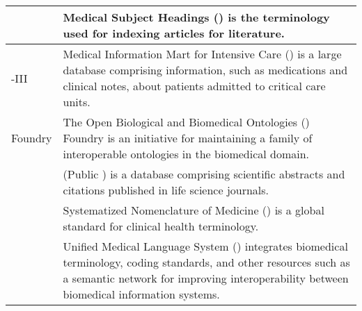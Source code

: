 {\begin{longtable}[c]{E{0.29\textwidth}p{0.67\textwidth}}
\midrule

 & Medical Subject Headings () is the terminology used for indexing articles for  literature.\\

\midrule

-III & Medical Information Mart for Intensive Care () is a large database comprising information, such as medications and clinical notes, about patients admitted to critical care units.\\

\midrule

 Foundry & The Open Biological and Biomedical Ontologies () Foundry is an initiative for maintaining a family of interoperable ontologies in the biomedical domain.\\

\midrule

 &  (Public ) is a database comprising scientific abstracts and citations published in life science journals.\\

\midrule

 & Systematized Nomenclature of Medicine () is a global standard for clinical health terminology.\\

\midrule

\newline\footnotesize{\parencite{mccray1989a}} & Unified Medical Language System () integrates biomedical terminology, coding standards, and other resources such as a semantic network for improving interoperability between biomedical information systems.\\


\end{longtable}}
